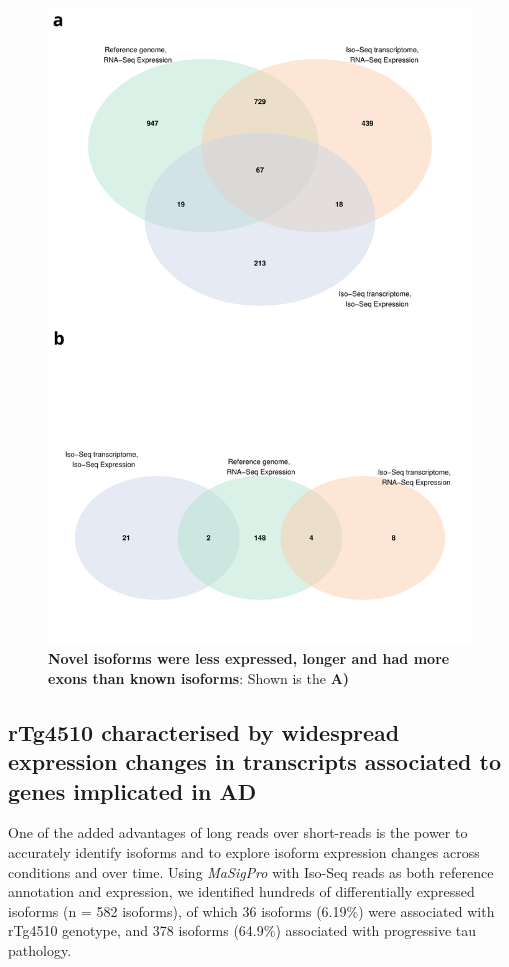 \begin{figure}[!htp]
	\begin{center}
		\includegraphics[page=11,scale = 0.55]{Figures/WholeDifferentialAnalysis.pdf}
	\end{center}
	\captionsetup{width=0.95\textwidth}
	\caption[Comparison of Known and Novel Isoforms from Iso-Seq Whole Transcriptome runs]%
	{\textbf{Novel isoforms were less expressed, longer and had more exons than known isoforms}: Shown is the \textbf{A)}}   
	\label{fig:whole_novelgene_diffexp}
\end{figure}



\clearpage
\subsection{rTg4510 characterised by widespread expression changes in transcripts associated to genes implicated in AD}
One of the added advantages of long reads over short-reads is the power to accurately identify isoforms and to explore isoform expression changes across conditions and over time. Using \textit{MaSigPro} with Iso-Seq reads as both reference annotation and expression, we identified hundreds of differentially expressed isoforms (n = 582 isoforms), of which 36 isoforms (6.19\%) were associated with rTg4510 genotype, and 378 isoforms (64.9\%) associated with progressive tau pathology. 

